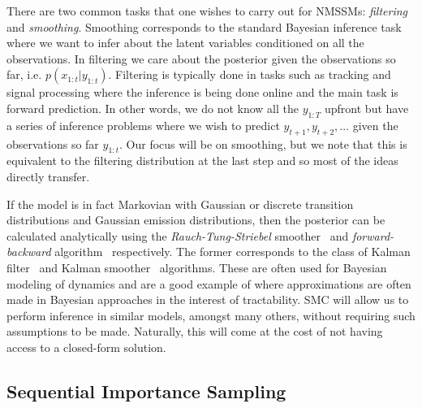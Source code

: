 There are two common tasks that one wishes to carry out for NMSSMs: \emph{filtering} and
\emph{smoothing}.  Smoothing corresponds to the standard Bayesian inference task where we
want to infer about the latent variables conditioned on all the observations.  In filtering
we care about the posterior given the observations
so far, i.e. $p(x_{1:t} | y_{1:t})$.  Filtering is typically done in tasks such as tracking and signal
processing where the inference is being done online and the main task is forward prediction.
In other words, we do not know all the $y_{1:T}$ upfront but have a series of inference problems
where we wish to predict $y_{t+1},y_{t+2},\dots$ given the observations so far $y_{1:t}$.  Our
focus will be on smoothing, but we note that this is equivalent to the filtering distribution
at the last step and so most of the ideas directly transfer.

If the model is in fact Markovian with Gaussian or discrete transition distributions and Gaussian
emission distributions, then the posterior can be calculated analytically using the \emph{Rauch-Tung-Striebel}
smoother~\citep{rauch1965maximum} and \emph{forward-backward} algorithm~\citep{rabiner1986introduction} respectively.
The former corresponds to the class of Kalman filter~\citep{kalman1960new} and Kalman smoother~\citep{rauch1965maximum}
algorithms.  These are often used for Bayesian modeling of dynamics and
are a good example of where approximations are often made in Bayesian approaches in the interest of
tractability.  SMC will allow us to perform inference in similar models, amongst many others, without requiring
such assumptions to be made.  Naturally, this will come at the cost of not having access to a closed-form solution.

\subsection{Sequential Importance Sampling}
\label{sec:part:smc:sis}

